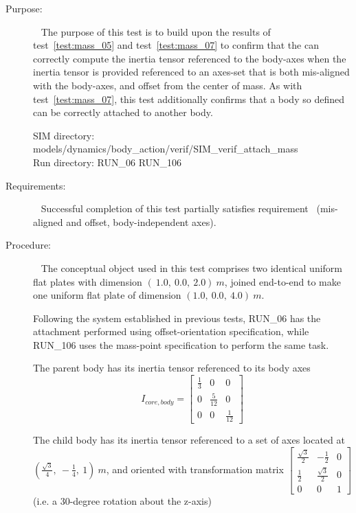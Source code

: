 \label{test:mass_06}
\begin{description}
\item[Purpose:] \ \newline
The purpose of this test is to build upon the results of 
test~\ref{test:mass_05} and test~\ref{test:mass_07} to confirm that the 
\ModelDesc can correctly compute the inertia tensor referenced to the 
body-axes 
when the inertia tensor is provided referenced to an axes-set that is both 
mis-aligned with the 
body-axes, and offset from the center of mass.  As with 
test~\ref{test:mass_07}, this test 
additionally confirms that a body so defined can be correctly attached to 
another body.

SIM directory: models/dynamics/body\_action/verif/SIM\_verif\_attach\_mass\\
Run directory: RUN\_06 RUN\_106


\item[Requirements:] \ \newline
Successful completion of this test partially satisfies
requirement~ (mis-aligned and offset, 
body-independent axes).


\item[Procedure:]\ \newline
The conceptual object used in this test comprises two identical uniform flat 
plates with dimension $(~1.0, ~0.0, ~2.0) ~m$, joined end-to-end to make one 
uniform flat plate of dimension $(1.0, ~0.0, ~4.0) ~m$.

Following the system established in previous tests, RUN\_06 has the attachment 
performed using offset-orientation specification, while RUN\_106 uses the 
mass-point specification to perform the same task.

The parent body has its inertia tensor referenced to its body axes
\begin{equation*}
I_{core, body} = 
   \begin{bmatrix} \frac{1}{3} & 0   & 0  \\
                   0   & \frac{5}{12} & 0   \\
                    0  & 0   & \frac{1}{12} 
   \end{bmatrix}
\end{equation*} 

The child body has its inertia tensor referenced to a set of axes located at 
$(\frac{\sqrt{3}}{4}, ~-\frac{1}{4}, ~1)~m$, and oriented with transformation 
matrix 
$\begin{bmatrix} \frac{\sqrt{3}}{2} & -\frac{1}{2}   & 0  \\
                   \frac{1}{2}   & \frac{\sqrt{3}}{2} & 0  \\
                    0  & 0   & 1 
   \end{bmatrix}
$
(i.e. a 30-degree rotation about the z-axis)


\end{description}
